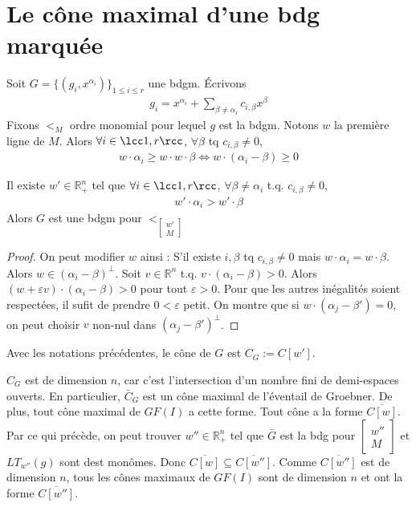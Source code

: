         \section{Le cône maximal d'une bdg marquée}
            Soit $G = \{(g_i, x^{\alpha_i})\}_{1 \leq i \leq r}$ une bdgm. Écrivons
            \begin{align*}
                g_i = x^{\alpha_i} + \sum_{\beta \neq \alpha_i} c_{i, \beta} x^\beta
            \end{align*}
            Fixons $<_M$ ordre monomial pour lequel $g$ est la bdgm. Notons $w$ la première ligne de $M$. Alors $\forall i \in \lcc 1,r \rcc$, $\forall \beta$ tq $c_{i, \beta} \neq 0$,
            \begin{align*}
                w \cdot \alpha_i \geq w \cdot w \cdot \beta \iff w \cdot (\alpha_i - \beta) \geq 0
            \end{align*}
            \begin{lemm}
                Il existe $w' \in \mathbb{R}^n_+$ tel que $\forall i \in \lcc 1,r \rcc$, $\forall \beta \neq \alpha_i$ t.q. $c_{i, \beta} \neq 0$,
                \begin{align*}
                    w' \cdot \alpha_i > w' \cdot \beta
                \end{align*}
                Alors $G$ est une bdgm pour $<_{\begin{bmatrix} w' \\ M \end{bmatrix}}$
            \end{lemm}
            \begin{proof}
                On peut modifier $w$ ainsi : S'il existe $i, \beta$ tq $c_{i, \beta} \neq 0$ mais $w \cdot \alpha_i = w \cdot \beta$. Alors $w \in (\alpha_i - \beta)^\bot$. Soit $v \in \mathbb{R}^n$ t.q. $v \cdot (\alpha_i - \beta) > 0$. Alors $(w + \varepsilon v) \cdot (\alpha_i - \beta) > 0$ pour tout $\varepsilon > 0$. Pour que les autres inégalités soient respectées, il sufit de prendre $0 < \varepsilon$ petit. On montre que si $w \cdot (\alpha_j - \beta') = 0$, on peut choisir $v$ non-nul dans $(\alpha_j - \beta')^\bot$.
            \end{proof}
            \begin{defi}
                Avec les notations précédentes, le cône de $G$ est $C_G := C[w']$.
            \end{defi}
            \begin{remq}
                $C_G$ est de dimension $n$, car c'est l'intersection d'un nombre fini de demi-espaces ouverts. En particulier, $\bar C_G$ est un cône maximal de l'éventail de Groebner. De plus, tout cône maximal de $GF(I)$ a cette forme. Tout cône a la forme $\overline{C[w]}$. Par ce qui précède, on peut trouver $w'' \in \mathbb{R}^n_+$ tel que $\bar G$ est la bdg pour $\begin{bmatrix} w'' \\ M \end{bmatrix}$ et $LT_{w''}(g)$ sont dest monômes. Donc $\overline{C[w]} \subseteq \overline{C[w'']}$. Comme $\overline{C[w'']}$ est de dimension $n$, tous les cônes maximaux de $GF(I)$ sont de dimension $n$ et ont la forme $\overline{C[w'']}$.
            \end{remq}
